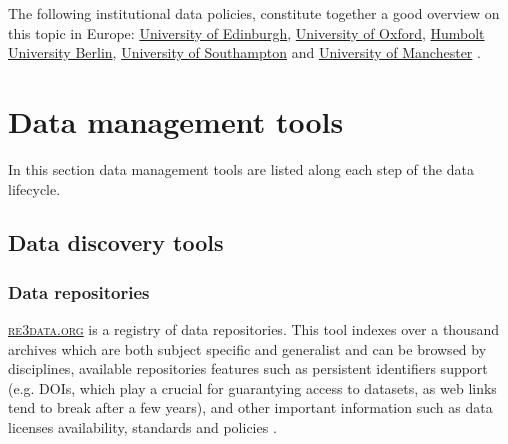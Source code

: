 \noindent {}     The following institutional data policies, constitute together a good overview on this topic in Europe: \href{http://www.ed.ac.uk/schools-departments/information-services/about/policies-and-regulations/research-data-policy}{University of Edinburgh}, \href{http://researchdata.ox.ac.uk/university-of-oxford-policy-on-the-management-of-research-data-and-records/}{University of Oxford}, \href{https://www.cms.hu-berlin.de/de/ueberblick/projekte/dataman/policy/policy-en/rdm-eng-policy}{Humbolt University Berlin}, \href{http://www.calendar.soton.ac.uk/sectionIV/research-data-management.html}{University of Southampton} and \href{http://www.miss.manchester.ac.uk/?page_id=425}{University of Manchester} \cite{university_of_edinburgh_research_2015,university_of_oxford_university_2015,humboldt_university_berlin_research_2015,university_of_manchester_university_2015,university_of_southampton_university_2015}.

\section{Data management tools}

In this section data management tools are listed along each step of the data lifecycle. 

\subsection{Data discovery tools}

\subsubsection{Data repositories}

\label{ddtsec}

\noindent {} \textsc{\href{http://re3data.org}{re3data.org}} is a registry of data repositories. This tool indexes over a thousand archives which are both subject specific and generalist and can be browsed by disciplines, available repositories features such as persistent identifiers support (e.g. DOIs, which play a crucial for guarantying access to datasets, as web links tend to break after a few years), and other important information such as data licenses availability, standards and policies \cite{re3data_re3data.org_2015}.

